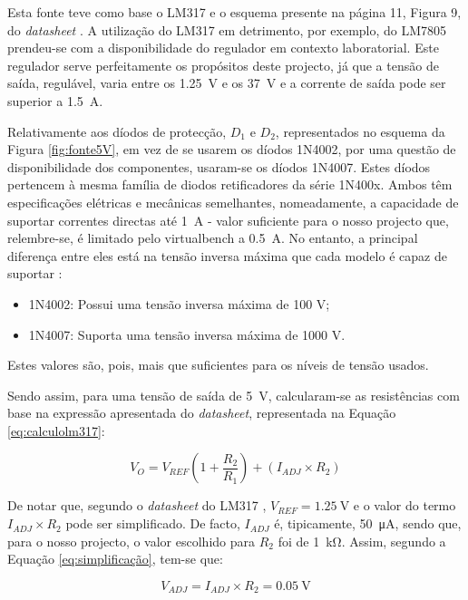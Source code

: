 Esta fonte teve como base o LM317 e o esquema presente na página 11, Figura 9, do \textit{datasheet} \cite{LM317}. A utilização do LM317 em detrimento, por exemplo, do LM7805 prendeu-se com a disponibilidade do regulador em contexto laboratorial. Este regulador serve perfeitamente os propósitos deste projecto, já que a tensão de saída, regulável, varia entre os \SI{1.25}{\volt} e os \SI{37}{\volt} e a corrente de saída pode ser superior a \SI{1.5}{\ampere}. 

Relativamente aos díodos de protecção, $D_{1}$ e $D_{2}$, representados no esquema da Figura \ref{fig:fonte5V}, em vez de se usarem os díodos 1N4002, por uma questão de disponibilidade dos componentes, usaram-se os díodos 1N4007. Estes díodos pertencem à mesma família de diodos retificadores da série 1N400x. Ambos têm especificações elétricas e mecânicas semelhantes, nomeadamente, a capacidade de suportar correntes directas até \SI{1}{\ampere} - valor suficiente para o nosso projecto que, relembre-se, é limitado pelo \acrshort{virtualbench} a \SI{0.5}{\ampere}. No entanto, a principal diferença entre eles está na tensão inversa máxima que cada modelo é capaz de suportar \cite{1N400x}:

\begin{itemize}
	\item 1N4002: Possui uma tensão inversa máxima de 100 V;
	\item 1N4007: Suporta uma tensão inversa máxima de 1000 V.
\end{itemize}

Estes valores são, pois, mais que suficientes para os níveis de tensão usados.

Sendo assim, para uma tensão de saída de \SI{5}{\volt}, calcularam-se as resistências com base na expressão apresentada do \textit{datasheet}, representada na Equação \ref{eq:calculolm317}: 

\begin{equation} \label{eq:calculolm317}
	V_{O} = V_{REF} (1 + \frac{R_{2}}{R_{1}}) + (I_{ADJ} \times R_{2})
\end{equation}

De notar que, segundo o \textit{datasheet} do LM317 \cite{LM317}, $V_{REF} = \SI{1.25}{\volt}$ e o valor do termo $I_{ADJ} \times R_{2}$ pode ser simplificado. De facto, $I_{ADJ}$ é, tipicamente, \SI{50}{\micro\ampere}, sendo que, para o nosso projecto, o valor escolhido para $R_{2}$ foi de \SI{1}{\kilo\ohm}. Assim, segundo a Equação \ref{eq:simplificação}, tem-se que:

\begin{equation} \label{eq:simplificação}
	V_{ADJ} = I_{ADJ} \times R_{2} = \SI{0.05}{\volt}
\end{equation}

